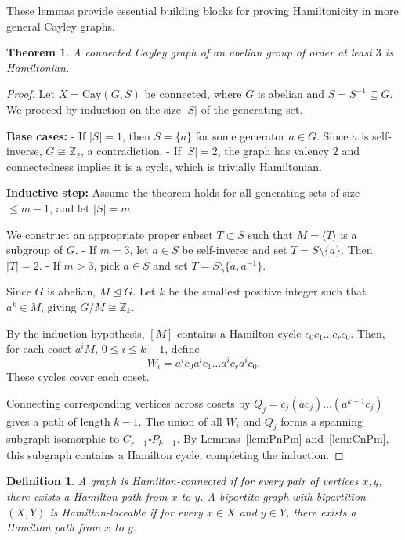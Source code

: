 \documentclass[12pt,a4paper,openany]{book}
\newtheorem{theorem}{Theorem}[section]
\newtheorem{definition}{Definition}[section]
\begin{document}
These lemmas provide essential building blocks for proving Hamiltonicity in more general Cayley graphs.

\begin{theorem}\label{thm:CayleyHamiltonian}
A connected Cayley graph of an abelian group of order at least $3$ is Hamiltonian.
\end{theorem}

\begin{proof}
Let $X = \mathrm{Cay}(G,S)$ be connected, where $G$ is abelian and $S = S^{-1} \subseteq G$. 
We proceed by induction on the size $|S|$ of the generating set.

\textbf{Base cases:}  
- If $|S| = 1$, then $S = \{a\}$ for some generator $a \in G$. Since $a$ is self-inverse, $G \cong \mathbb{Z}_2$, a contradiction.  
- If $|S| = 2$, the graph has valency $2$ and connectedness implies it is a cycle, which is trivially Hamiltonian.

\textbf{Inductive step:}  
Assume the theorem holds for all generating sets of size $\le m-1$, and let $|S| = m$.  

We construct an appropriate proper subset $T \subset S$ such that $M = \langle T \rangle$ is a subgroup of $G$.  
- If $m=3$, let $a \in S$ be self-inverse and set $T = S \setminus \{a\}$. Then $|T|=2$.  
- If $m>3$, pick $a \in S$ and set $T = S \setminus \{a,a^{-1}\}$.  

Since $G$ is abelian, $M \trianglelefteq G$. Let $k$ be the smallest positive integer such that $a^k \in M$, giving $G/M \cong \mathbb{Z}_k$.  

By the induction hypothesis, $[M]$ contains a Hamilton cycle $c_0 c_1 \dots c_r c_0$.  
Then, for each coset $a^i M$, $0 \le i \le k-1$, define
\[
W_i = a^i c_0 a^i c_1 \dots a^i c_r a^i c_0.
\]
These cycles cover each coset.  

Connecting corresponding vertices across cosets by $Q_j = c_j (a c_j) \dots (a^{k-1} c_j)$ gives a path of length $k-1$. The union of all $W_i$ and $Q_j$ forms a spanning subgraph isomorphic to $C_{r+1} \square P_{k-1}$. By Lemmas~\ref{lem:PnPm} and~\ref{lem:CnPm}, this subgraph contains a Hamilton cycle, completing the induction.
\end{proof}

\begin{definition}
A graph is \emph{Hamilton-connected} if for every pair of vertices $x,y$, there exists a Hamilton path from $x$ to $y$.  
A bipartite graph with bipartition $(X,Y)$ is \emph{Hamilton-laceable} if for every $x \in X$ and $y \in Y$, there exists a Hamilton path from $x$ to $y$.
\end{definition}
\end{document}
